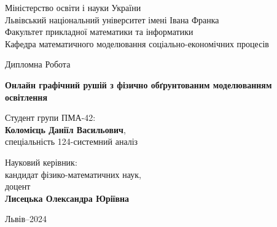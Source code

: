 \thispagestyle{empty}
\renewcommand{\baselinestretch}{1}

\Large
\begin{center}
Міністерство освіти і науки України \\
Львівський національний університет імені Івана Франка \\
Факультет прикладної математики та інформатики \\
Кафедра математичного моделювання соціально-економічних процесів
\end{center}

\vspace*{2cm}
\begin{center}
\huge Дипломна Робота
\end{center}

\vspace*{1cm}
\large
\begin{center}
\textbf{Онлайн графічний рушій з фізично обґрунтованим моделюванням освітлення} \\
\end{center}
\vspace*{1cm}
\normalsize

\vspace*{1.5cm}
\noindent
\hspace*{8.6cm}Студент групи ПМА-42: \\
\hspace*{8.6cm}\textbf{Коломієць Даніїл Васильович}, \\
\hspace*{8.6cm}спеціальність 124-системний аналіз

\vspace*{0.5cm}
\noindent
\hspace*{8.6cm}Науковий керівник: \\
\hspace*{8.6cm}кандидат фізико-математичних наук, \\
\hspace*{8.6cm}доцент \\
\hspace*{8.6cm}\textbf{Лисецька Олександра Юріївна}

\vspace*{0.0cm}
\noindent

\vspace*{1.5cm}
\large
\begin{center}
Львів--2024
\end{center}
\normalsize
\renewcommand{\baselinestretch}{1.3}
\tableofcontents
